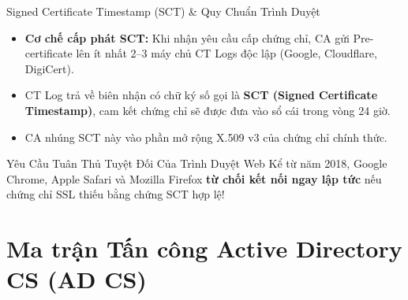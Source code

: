 \begin{frame}{Signed Certificate Timestamp (SCT) \& Quy Chuẩn Trình Duyệt}
  \begin{itemize}\small
    \item \textbf{Cơ chế cấp phát SCT:} Khi nhận yêu cầu cấp chứng chỉ, CA gửi Pre-certificate lên ít nhất 2--3 máy chủ CT Logs độc lập (Google, Cloudflare, DigiCert).
    \item CT Log trả về biên nhận có chữ ký số gọi là \textbf{SCT (Signed Certificate Timestamp)}, cam kết chứng chỉ sẽ được đưa vào sổ cái trong vòng 24 giờ.
    \item CA nhúng SCT này vào phần mở rộng X.509 v3 của chứng chỉ chính thức.
  \end{itemize}

  \begin{alertblock}{Yêu Cầu Tuân Thủ Tuyệt Đối Của Trình Duyệt Web}
    Kể từ năm 2018, Google Chrome, Apple Safari và Mozilla Firefox \textbf{từ chối kết nối ngay lập tức} nếu chứng chỉ SSL thiếu bằng chứng SCT hợp lệ!
  \end{alertblock}
\end{frame}

\section{Ma trận Tấn công Active Directory CS (AD CS)}

